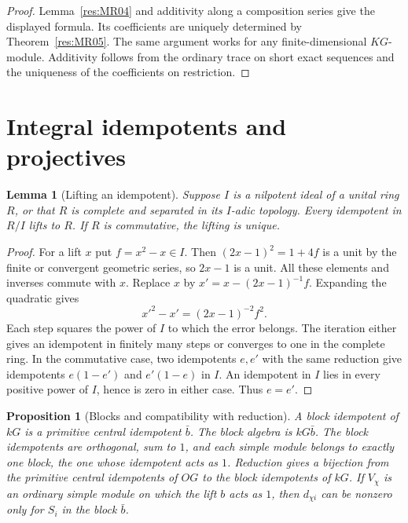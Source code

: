 \documentclass[11pt,oneside,openany]{book}
\newtheorem{lemma}[theorem]{Lemma}
\newtheorem{proposition}[theorem]{Proposition}
\theoremstyle{definition}
\theoremstyle{remark}
\begin{document}
\begin{proof}
Lemma~\ref{res:MR04} and additivity along a composition series
give the displayed formula. Its coefficients are uniquely
determined by Theorem~\ref{res:MR05}. The same argument works
for any finite-dimensional \(KG\)-module. Additivity follows
from the ordinary trace on short exact sequences and the
uniqueness of the coefficients on restriction.
\end{proof}

\section{Integral idempotents and projectives}

\begin{lemma}[Lifting an idempotent]
\label{res:MR07}
Suppose \(I\) is a nilpotent ideal of a unital ring \(R\), or
that \(R\) is complete and separated in its \(I\)-adic
topology. Every idempotent in \(R/I\) lifts to \(R\). If \(R\)
is commutative, the lifting is unique.
\end{lemma}

\begin{proof}
For a lift \(x\) put \(f=x^2-x\in I\). Then
\((2x-1)^2=1+4f\) is a unit by the finite or convergent
geometric series, so \(2x-1\) is a unit. All these elements
and inverses commute with \(x\). Replace \(x\) by
\(x'=x-(2x-1)^{-1}f\). Expanding the quadratic gives
\[
 x'^2-x'=(2x-1)^{-2}f^2 .
\]
Each step squares the power of \(I\) to which the error
belongs. The iteration either gives an idempotent in finitely
many steps or converges to one in the complete ring. In the
commutative case, two idempotents \(e,e'\) with the same
reduction give idempotents \(e(1-e')\) and \(e'(1-e)\) in
\(I\). An idempotent in \(I\) lies in every positive power
of \(I\), hence is zero in either case. Thus \(e=e'\).
\end{proof}

\begin{proposition}[Blocks and compatibility with reduction]
\label{res:MR08}
A block idempotent of \(kG\) is a primitive central
idempotent \(\bar b\). The block algebra is \(kG\bar b\).
The block idempotents are orthogonal, sum to \(1\), and
each simple module belongs to exactly one block, the one
whose idempotent acts as \(1\). Reduction gives a bijection
from the primitive central idempotents of \(OG\) to the block
idempotents of \(kG\). If \(V_\chi\) is an ordinary simple
module on which the lift \(b\) acts as \(1\), then
\(d_{\chi i}\) can be nonzero only for \(S_i\) in the block
\(\bar b\).
\end{proposition}
\end{document}
